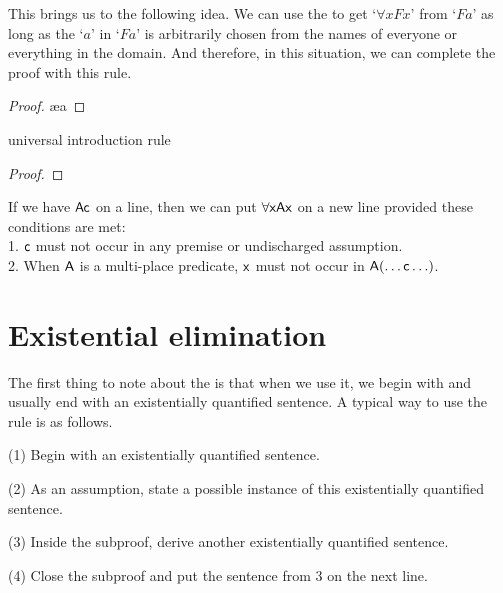 This brings us to the following idea. We can use the  to get `$\forall x Fx$' from `$Fa$' as long as the `$a$' in `$Fa$' is arbitrarily chosen from the names of everyone or everything in the domain. And therefore, in this situation, we can complete the proof with this rule.

\begin{proof}
	 \pr{}
	 
	 \ae{a}
	 
\end{proof}

\begin{factboxy}{universal introduction rule}
\begin{proof}
	 
\end{proof}

\small{If we have $\mathsf{Ac}$ on a line, then we can put $\forall \mathsf{xAx}$ on a new line provided these conditions are met:\\
1. $\mathsf{c}$ must not occur in any premise or undischarged assumption.\\
2. When $\mathsf{A}$ is a multi-place predicate, $\mathsf{x}$ must not occur in $\mathsf{A(\ldots c\ldots)}$.
}
\end{factboxy}


\filbreak

\section{Existential elimination}

The first thing to note about the  is that when we use it, we begin with and usually end with an existentially quantified sentence. A typical way to use the rule is as follows. 

\begin{ebullet}
\item[(1)] Begin with an existentially quantified sentence. 
\item[(2)] As an assumption, state a possible instance of this existentially quantified sentence. 
\item[(3)] Inside the subproof, derive another existentially quantified sentence.
\item[(4)] Close the subproof and put the sentence from 3 on the next line. 
\end{ebullet}

